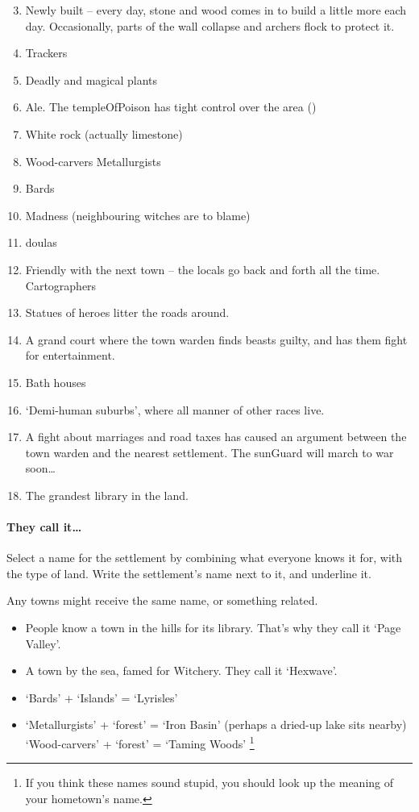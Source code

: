 \begin{multicols}{2}
\begin{enumerate}
\setcounter{enumi}{2}
  \item
  Newly built -- every day, stone and wood comes in to build a little more each day.
  Occasionally, parts of the wall collapse and archers flock to protect it.
  \item
  Trackers
  \item
  Deadly and magical plants
  \item
  Ale.
  The \gls{templeOfPoison} has tight control over the area ()
  \item
  White rock (actually limestone)
  \item
  \ifodd\value{r4}
    Wood-carvers
  \else
    Metallurgists
  \fi
  \item
 Bards
  \item
  Madness (neighbouring witches are to blame)
  \item
  \Glspl{doula}
  \item
  \ifodd\value{r4}
  Friendly with the next town -- the locals go back and forth all the
    time.
  \else
    Cartographers
  \fi
  \item
  Statues of heroes litter the roads around.
  \item
  A grand \gls{court} where the town \gls{warden} finds beasts guilty, and has them fight for entertainment.
  \item
  Bath houses
  \item
  `Demi-human suburbs', where all manner of other races live.
  \item
  A fight about marriages and road taxes has caused an argument between the town \gls{warden} and the nearest settlement.
  The \gls{sunGuard} will march to war soon\ldots
  \item
  The grandest library in the land.
\end{enumerate}

\paragraph{They call it\ldots{}}

Select a name for the settlement by combining what everyone knows it for, with the type of land.
Write the settlement's name next to it, and underline it.

Any towns might receive the same name, or something related.

\begin{itemize}
  \item
  People know a town in the hills for its library. That's why they call
  it `Page Valley'.
  \item
  A town by the sea, famed for Witchery.
  They call it `Hexwave'.
  \item
  `Bards' + `Islands' = `Lyrisles'
  \item
  \ifodd\value{r4}
    `Metallurgists' + `forest' = `Iron Basin' (perhaps a dried-up lake sits nearby)
  \else
    `Wood-carvers' + `forest' = `Taming Woods'%
  \fi
  \footnote{If you think these names sound stupid, you should look up the meaning of your hometown's name.}
\end{itemize}


\end{multicols}
